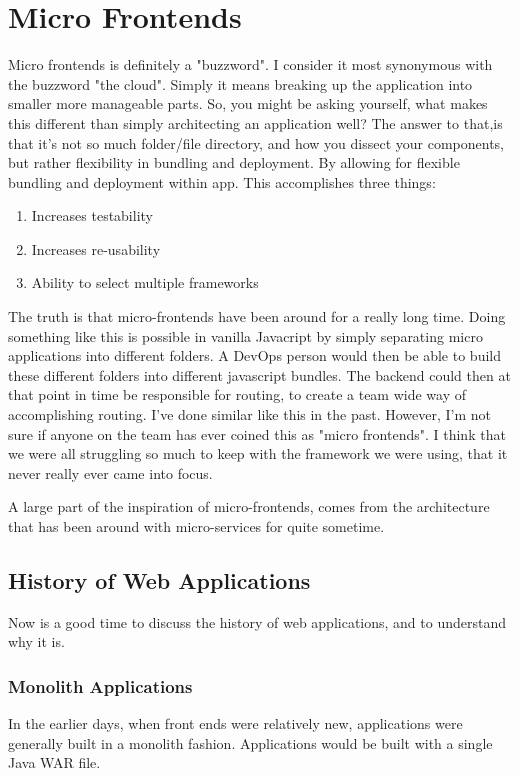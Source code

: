 \chapter{ Micro Frontends }
Micro frontends is definitely a "buzzword". I consider it most synonymous with the buzzword "the cloud". Simply it means breaking up the application into smaller more manageable parts. So, you might be asking yourself, what makes this different than simply architecting an application well? The answer to that,is that it's not so much folder/file directory, and how you dissect your components, but rather flexibility in bundling and deployment. By allowing for flexible bundling and deployment within app. This accomplishes three things: 
\begin{enumerate}
  \item Increases testability
  \item Increases re-usability
  \item Ability to select multiple frameworks
\end{enumerate}

The truth is that micro-frontends have been around for a really long time. Doing something like this is possible in vanilla Javacript by simply separating micro applications into different folders. A DevOps person would then be able to build these different folders into different javascript bundles. The backend could then at that point in time be responsible for routing, to create a team wide way of accomplishing routing. I've done similar like this in the past. However, I'm not sure if anyone on the team has ever coined this as "micro frontends". I think that we were all struggling so much to keep with the framework we were using, that it never really ever came into focus. 

A large part of the inspiration of micro-frontends, comes from the architecture that has been around with micro-services for quite sometime. 

\section{History of Web Applications}
Now is a good time to discuss the history of web applications, and to understand why it is.

\subsection{Monolith Applications}
In the earlier days, when front ends were relatively new, applications were generally built in a monolith fashion. Applications would be built with a single Java WAR file.

